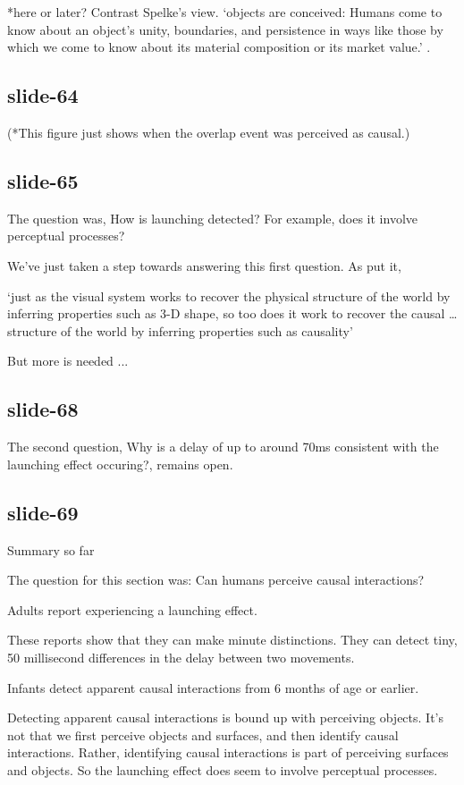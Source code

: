 \documentclass[12pt,\papersize]{extarticle}
\begin{document}
*here or later?
Contrast Spelke’s view.
‘objects are conceived: Humans come to know about an object’s unity, boundaries, and 
persistence in ways like those by which we come to know about its material composition 
or its market value.’
\citep[p.\ 198]{Spelke:1988xc}.
 
\subsection{slide-64}
(*This figure just shows when the overlap event was perceived as causal.)
 
\subsection{slide-65}
The question was,
How is launching detected?  For example, does it involve perceptual processes?
 
We've just taken a step towards answering this first question.  As 
\citet[p.\ 299]{Scholl:2000eq} put it,
 
‘just as the visual system works to recover the physical structure of the world by inferring 
properties such as 3-D shape, so too does it work to recover the causal …  structure of 
the world by inferring properties such as causality’ 
\citep[p.\ 299]{Scholl:2000eq}
 
But more is needed ...
 
\subsection{slide-68}
The second question, Why is a delay of up to around 70ms consistent with the 
launching effect occuring?, remains open.
 
\subsection{slide-69}
Summary so far
 
The question for this section was:
Can humans perceive causal interactions?
 
Adults report experiencing a launching effect.

          
These reports show that they can make minute distinctions.
They can detect tiny, 50 millisecond differences in the delay between two movements.

          
Infants detect apparent causal interactions from 6 months of age or earlier.

          
Detecting apparent causal interactions is bound up with perceiving objects.
It's not that we first perceive objects and surfaces, and then identify causal interactions.
Rather, identifying causal interactions is part of perceiving surfaces and objects.  
So the launching effect does seem to involve perceptual processes.
 
\end{document}
